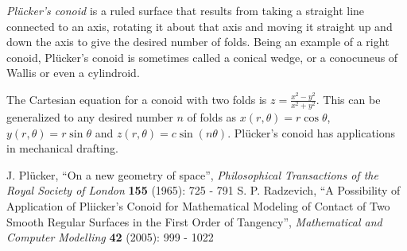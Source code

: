 \documentclass[12pt]{article}
\begin{document}
\emph{Pl\"ucker's conoid} is a ruled surface that results from taking a straight line connected to an axis, rotating it about that axis and moving it straight up and down the axis to give the desired number of folds. Being an example of a right conoid, Pl\"ucker's conoid is sometimes called a conical wedge, or a conocuneus of Wallis or even a cylindroid.

The Cartesian equation for a conoid with two folds is $z = \frac{x^2 - y^2}{x^2 + y^2}$. This can be generalized to any desired number $n$ of folds as $x(r, \theta) = r \cos \theta$, $y(r, \theta) = r \sin \theta$ and $z(r, \theta) = c \sin (n\theta)$. Pl\"ucker's conoid has applications in mechanical drafting.

\begin{thebibliography}{1}
 J. Pl\"ucker, ``On a new geometry of space'', {\it Philosophical Transactions of the Royal Society of London} {\bf 155} (1965): 725 - 791
 S. P. Radzevich, ``A Possibility of Application of Pliicker's Conoid for Mathematical Modeling of Contact of Two Smooth Regular Surfaces in the First Order of Tangency'', {\it Mathematical and Computer Modelling} {\bf 42} (2005): 999 - 1022
\end{thebibliography}
\end{document}

